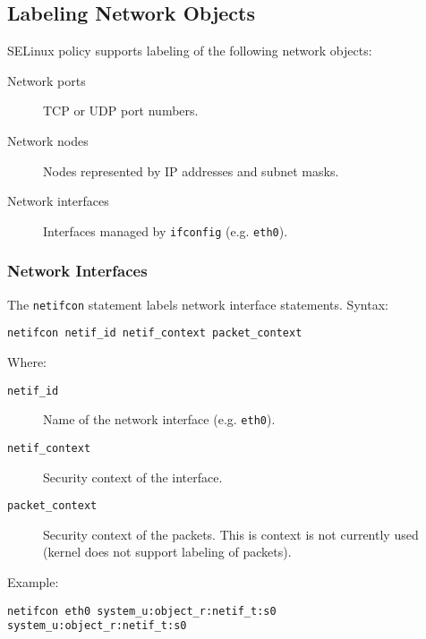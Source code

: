 \subsection{Labeling Network Objects}

SELinux policy supports labeling of the following network objects:
\begin{description}
    \item [Network ports] TCP or UDP port numbers.
    \item [Network nodes] Nodes represented by IP addresses and subnet masks.
    \item [Network interfaces] Interfaces managed by \texttt{ifconfig} (e.g.
        \texttt{eth0}).
\end{description}

\subsubsection{Network Interfaces}
The \texttt{netifcon} statement labels network interface statements. Syntax:
\begin{lstlisting}[language=te]
netifcon netif_id netif_context packet_context
\end{lstlisting}
Where:
\begin{description}
    \item [\texttt{netif\_id}] Name of the network interface (e.g.
        \texttt{eth0}).
    \item [\texttt{netif\_context}] Security context of the interface.
    \item [\texttt{packet\_context}] Security context of the packets. This is
        context is not currently used (kernel does not support labeling of
        packets).
\end{description}
Example:
\begin{lstlisting}[language=te]
netifcon eth0 system_u:object_r:netif_t:s0 system_u:object_r:netif_t:s0
\end{lstlisting}

